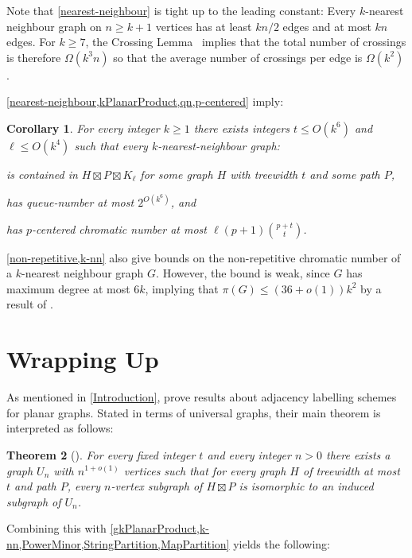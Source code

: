 \documentclass{patmorin}
\theoremstyle{plain}
\newtheorem{thm}{Theorem}
\newtheorem{cor}[thm]{Corollary}
\theoremstyle{definition}
\renewcommand{\ge}{\geqslant}
\renewcommand{\geq}{\geqslant}
\renewcommand{\leq}{\leqslant}
\begin{document}
Note that \cref{nearest-neighbour} is tight up to the leading constant:  Every $k$-nearest neighbour graph on $n\ge k+1$ vertices has at least $kn/2$ edges and at most $kn$ edges.  For $k\ge 7$, the Crossing Lemma~\citep{ajtai.chvatal.ea:crossing-free,leighton:complexity} implies that the total number of crossings is therefore $\Omega(k^3n)$ so that the average number of crossings per edge is $\Omega(k^2)$.

\cref{nearest-neighbour,kPlanarProduct,qn,p-centered} imply:

\begin{cor}
\label{k-nn}
For every integer $k\geq 1$ there exists integers $t\leq O(k^6)$ and $\ell\leq O(k^4)$ such that every $k$-nearest-neighbour graph:
\begin{compactitem}
\item is contained in $H\boxtimes P \boxtimes K_\ell$ for some graph $H$ with treewidth $t$ and some path $P$,
\item has queue-number at most $2^{O(k^6)}$, and
\item has $p$-centered chromatic number at most $\ell (p+1)\binom{p+t}{t}$.
\end{compactitem}
\end{cor}

\cref{non-repetitive,k-nn} also give bounds on the non-repetitive chromatic number of a $k$-nearest neighbour graph $G$. However, the bound is weak, since $G$ has maximum degree at most $6k$, implying that $\pi(G) \leq (36+o(1))k^2$ by a result of \citet{DJKW16}.

\section{Wrapping Up}
\label{WrappingUp}

As mentioned in \cref{Introduction}, \citet{DEJGMM21} prove results about adjacency labelling schemes for planar graphs. Stated in terms of universal graphs, their main theorem is interpreted as follows:

\begin{thm}[\citep{DEJGMM21}]
	\label{Universal}
	For every fixed integer $t$ and every integer $n>0$ there exists a
	graph $U_n$ with $n^{1+o(1)}$ vertices such that for every graph $H$ of
	treewidth at most $t$ and path $P$, every $n$-vertex subgraph of $H\boxtimes P$ is isomorphic to an induced subgraph of $U_n$.
\end{thm}

Combining this with \cref{gkPlanarProduct,k-nn,PowerMinor,StringPartition,MapPartition} yields the following:
\end{document}

